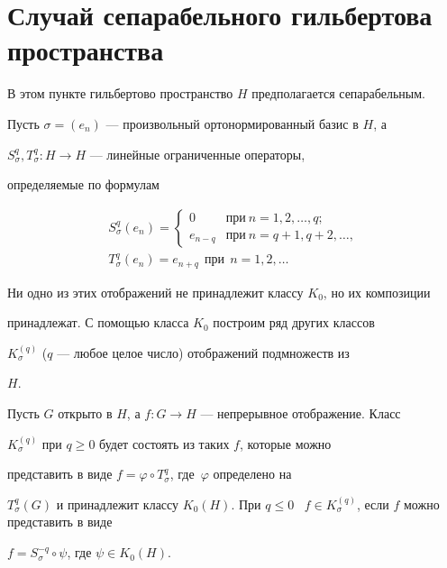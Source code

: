  


\section{Случай сепарабельного гильбертова пространства} 


 


В этом пункте гильбертово пространство $H$ предполагается сепарабельным. 


 


Пусть $\sigma=(e_n)$ --- произвольный ортонормированный базис в $H$, а 


$S^q_\sigma,T^q_\sigma:H\to H$ --- линейные ограниченные операторы, 


определяемые по формулам 


\begin{gather} 


S^q_\sigma(e_n)= 


\begin{cases} 


0&\text{при}\ n=1,2,\dotsc,q;\\ 


e_{n-q}&\text{при}\ n=q+1,q+2,\dotsc, 


\end{cases} 


\\ 


T^q_\sigma(e_n)=e_{n+q}\ \ \text{при}\ \ n=1,2,\dotsc 


\end{gather} 


Ни одно из этих отображений не принадлежит классу $K_0$, но их композиции 


принадлежат. С помощью класса $K_0$ построим ряд других классов 


$K^{(q)}_\sigma$ ($q$ --- любое целое число) отображений подмножеств из 


$H$. 


 


\begin{defn} 


Пусть $G$ открыто в $H$, а $f:G\to H$ --- непрерывное отображение. Класс 


$K^{(q)}_\sigma$ при $q\ge0$ будет состоять из таких $f$, которые можно 


представить в виде $f=\varphi\circ T^q_\sigma$, где~$\varphi$ определено на 


$T^q_\sigma(G)$ и принадлежит классу $K_0(H)$. При $q\le0$ \ $f\in 


K^{(q)}_\sigma$, если $f$ можно представить в виде 


$f=S^{-q}_\sigma\circ\psi$, где $\psi\in K_0(H)$. 


\end{defn} 


